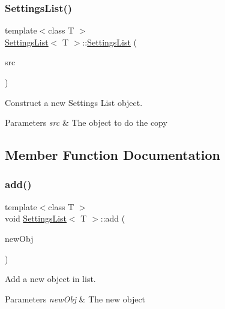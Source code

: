 \subsubsection{\texorpdfstring{Settings\+List()}{SettingsList()}\hspace{0.1cm}{\footnotesize\ttfamily [2/2]}}
{\footnotesize\ttfamily template$<$class T $>$ \\
\hyperlink{class_settings_list}{Settings\+List}$<$ T $>$\+::\hyperlink{class_settings_list}{Settings\+List} (\begin{DoxyParamCaption}\item[{\hyperlink{class_settings_list}{Settings\+List}$<$ T $>$ const \&}]{src }\end{DoxyParamCaption})\hspace{0.3cm}{\ttfamily [inline]}}



Construct a new Settings List object. 


\begin{DoxyParams}{Parameters}
{\em src} & The object to do the copy \\
\hline
\end{DoxyParams}


\subsection{Member Function Documentation}
\mbox{\label{class_settings_list_a924dc826131b830aa9a51d6974edb35f}} 
\subsubsection{\texorpdfstring{add()}{add()}}
{\footnotesize\ttfamily template$<$class T $>$ \\
void \hyperlink{class_settings_list}{Settings\+List}$<$ T $>$\+::add (\begin{DoxyParamCaption}\item[{T $\ast$}]{new\+Obj }\end{DoxyParamCaption})\hspace{0.3cm}{\ttfamily [inline]}}



Add a new object in list. 


\begin{DoxyParams}{Parameters}
{\em new\+Obj} & The new object \\
\hline
\end{DoxyParams}
\mbox{\label{class_settings_list_aed522696851838b46c6b539f38e24d44}} 

